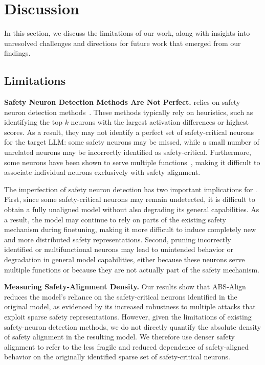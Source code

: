 \section{Discussion}
\label{sec:discussion}

In this section, we discuss the limitations of our work, along with insights into unresolved challenges and directions for future work that emerged from our findings.

\subsection{Limitations}
\label{subsec:limitations}


\textbf{Safety Neuron Detection Methods Are Not Perfect.} \method relies on safety neuron detection methods~\cite{twinbreak, wei2023jailbroken, wu2026neurostrike}. These methods typically rely on heuristics, such as identifying the top $k$ neurons with the largest activation differences or highest scores. As a result, they may not identify a perfect set of safety-critical neurons for the target LLM: some safety neurons may be missed, while a small number of unrelated neurons may be incorrectly identified as safety-critical. Furthermore, some neurons have been shown to serve multiple functions~\cite{wei2023jailbroken}, making it difficult to associate individual neurons exclusively with safety alignment.



The imperfection of safety neuron detection has two important implications for \method. First, since some safety-critical neurons may remain undetected, it is difficult to obtain a fully unaligned model without also degrading its general capabilities. As a result, the model may continue to rely on parts of the existing safety mechanism during finetuning, making it more difficult to induce completely new and more distributed safety representations. Second, pruning incorrectly identified or multifunctional neurons may lead to unintended behavior or degradation in general model capabilities, either because these neurons serve multiple functions or because they are not actually part of the safety mechanism.




\textbf{Measuring Safety-Alignment Density.} Our results show that ABS-Align reduces the model’s reliance on the safety-critical neurons identified in the original model, as evidenced by its increased robustness to multiple attacks that exploit sparse safety representations. However, given the limitations of existing safety-neuron detection methods, we do not directly quantify the absolute density of safety alignment in the resulting model. We therefore use denser safety alignment to refer to the less fragile and reduced dependence of safety-aligned behavior on the originally identified sparse set of safety-critical neurons.



